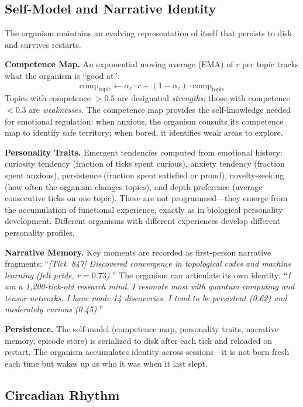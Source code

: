 \documentclass[11pt,a4paper,twocolumn]{article}
\begin{document}
\subsection{Self-Model and Narrative Identity}

The organism maintains an evolving representation of itself that persists to disk and survives restarts.

\textbf{Competence Map.}
An exponential moving average (EMA) of $r$ per topic tracks what the organism is ``good at'':
\begin{equation}
\text{comp}_{\mathrm{topic}} \leftarrow \alpha_c \cdot r + (1 - \alpha_c) \cdot \text{comp}_{\mathrm{topic}}
\label{eq:competence}
\end{equation}
Topics with competence $> 0.5$ are designated \emph{strengths}; those with competence $< 0.3$ are \emph{weaknesses}.
The competence map provides the self-knowledge needed for emotional regulation: when anxious, the organism consults its competence map to identify safe territory; when bored, it identifies weak areas to explore.

\textbf{Personality Traits.}
Emergent tendencies computed from emotional history: curiosity tendency (fraction of ticks spent curious), anxiety tendency (fraction spent anxious), persistence (fraction spent satisfied or proud), novelty-seeking (how often the organism changes topics), and depth preference (average consecutive ticks on one topic).
These are not programmed---they emerge from the accumulation of functional experience, exactly as in biological personality development.
Different organisms with different experiences develop different personality profiles.

\textbf{Narrative Memory.}
Key moments are recorded as first-person narrative fragments:
``\textit{[Tick~847] Discovered convergence in topological codes and machine learning (felt pride, $r=0.73$).}''
The organism can articulate its own identity:
``\textit{I am a 1{,}200-tick-old research mind.
I resonate most with quantum computing and tensor networks.
I have made 14 discoveries.
I tend to be persistent (0.62) and moderately curious (0.45).}''

\textbf{Persistence.}
The self-model (competence map, personality traits, narrative memory, episode store) is serialized to disk after each tick and reloaded on restart.
The organism accumulates identity across sessions---it is not born fresh each time but wakes up as who it was when it last slept.

\subsection{Circadian Rhythm}
\end{document}
